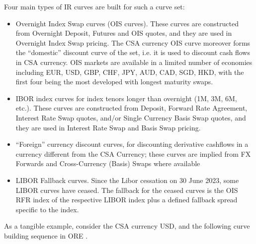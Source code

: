 \medskip
Four main types of IR curves are built for such a curve set:
\begin{itemize}
\item Overnight Index Swap curves (OIS curves). These curves are
  constructed from Overnight Deposit, Futures and OIS quotes, and they
  are used in  Overnight Index Swap pricing. The CSA  currency OIS
  curve moreover forms the ``domestic'' discount curve of the set,
  i.e. it is used to discount  cash flows in CSA currency. 
  OIS markets are available in  a limited number of economies including
  EUR, USD, GBP, CHF, JPY, AUD, CAD, SGD, HKD, with the first
  four being the most developed with longest maturity swaps.
  
\item IBOR index curves for index tenors longer than overnight (1M,
  3M, 6M, etc.). These curves are constructed from Deposit, Forward
  Rate Agreement, Interest Rate Swap quotes, and/or Single Currency
  Basis Swap quotes, and they  are used in Interest Rate Swap and
  Basis Swap pricing.
  
\item ``Foreign'' currency discount curves, for discounting derivative
  cashflows in a currency different from the CSA Currency; these
  curves are implied from FX Forwards and Cross-Currency (Basis) Swaps
  where available
  
 \item LIBOR Fallback curves. Since the Libor cessation on 30 June 2023, some LIBOR curves have ceased. The fallback for the ceased curves is the OIS RFR index of the respective LIBOR index plus a defined fallback spread specific to the index. 
  
\end{itemize}


\medskip
As a tangible example, consider the CSA currency USD, and the
following curve building sequence in ORE \cite{ORE}.
 
